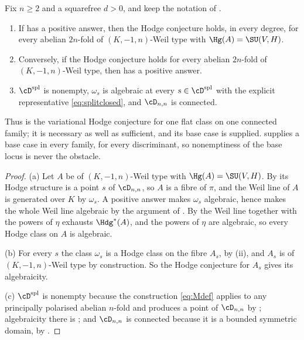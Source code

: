 \begin{theorem}\label{thm:residual}
Fix $n\ge2$ and a squarefree $d>0$, and keep the notation of
.
\begin{enumerate}[label=\textup{(\alph*)},nosep]
\item If  has a positive answer, then the Hodge conjecture
  holds, in every degree, for every abelian $2n$-fold of $(K,-1,n)$-Weil type
  with $\Hg(A)=\SU(V,H)$.
\item Conversely, if the Hodge conjecture holds for every abelian $2n$-fold of
  $(K,-1,n)$-Weil type, then  has a positive answer.
\item $\cD^{\mathrm{spl}}$ is nonempty, $\omega_{s}$ is algebraic at every
  $s\in\cD^{\mathrm{spl}}$ with the explicit representative
  \eqref{eq:splitclosed}, and $\cD_{n,n}$ is connected.
\end{enumerate}
Thus  is the variational Hodge conjecture for one flat class
on one connected family; it is necessary as well as sufficient, and its base
case is supplied.  supplies a base case in every family,
for every discriminant, so nonemptiness of the base locus is never the
obstacle.
\end{theorem}

\begin{proof}
(a) Let $A$ be of $(K,-1,n)$-Weil type with $\Hg(A)=\SU(V,H)$. By
 its Hodge structure is a point $s$ of $\cD_{n,n}$, so
$A$ is a fibre of $\pi$, and the Weil line of $A$ is generated over $K$ by
$\omega_{s}$. A positive answer makes $\omega_{s}$ algebraic, hence makes the
whole Weil line algebraic by the argument of . By
 the Weil line together with the powers of $\eta$ exhausts
$\Hdg^{*}(A)$, and the powers of $\eta$ are algebraic, so every Hodge class on
$A$ is algebraic.

(b) For every $s$ the class $\omega_{s}$ is a Hodge class on the fibre $A_{s}$,
by (ii), and $A_{s}$ is of $(K,-1,n)$-Weil type by
construction. So the Hodge conjecture for $A_{s}$ gives its algebraicity.

(c) $\cD^{\mathrm{spl}}$ is nonempty because the construction \eqref{eq:Mdef}
applies to any principally polarised abelian $n$-fold and produces a point of
$\cD_{n,n}$ by ; algebraicity there is
; and $\cD_{n,n}$ is connected because it is a
bounded symmetric domain, by .
\end{proof}

